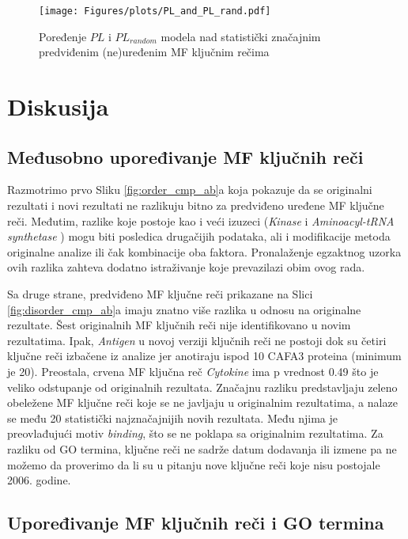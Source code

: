 \begin{figure}[th]
\hspace*{-3.0cm} 
\texttt{[image: Figures/plots/PL\_and\_PL\_rand.pdf]}
\caption {
  Poređenje $PL$ i $PL_{random}$ modela nad statistički značajnim predviđenim (ne)uređenim MF ključnim rečima
}
\label{fig:PLrand}
\end{figure}




\chapter{Diskusija} %

\label{Diskusija} %

\section{Međusobno upoređivanje MF ključnih reči}

Razmotrimo prvo Sliku \ref{fig:order_cmp_ab}a koja pokazuje da se originalni
rezultati i novi rezultati ne razlikuju bitno za predviđeno uređene MF ključne
reči. Međutim, razlike koje postoje kao i veći izuzeci (\textit{Kinase} i
\textit{Aminoacyl-tRNA synthetase} )  mogu biti posledica drugačijih podataka,
ali i modifikacije metoda originalne analize ili čak kombinacije oba faktora.
Pronalaženje egzaktnog uzorka ovih razlika zahteva dodatno istraživanje koje
prevazilazi obim ovog rada.

Sa druge strane, predviđeno  MF ključne reči prikazane na
Slici \ref{fig:disorder_cmp_ab}a imaju znatno više razlika u odnosu na
originalne rezultate.  Šest originalnih MF ključnih reči nije identifikovano u
novim rezultatima. Ipak, \textit{Antigen} u novoj verziji ključnih reči ne
postoji dok su četiri ključne reči izbačene iz analize jer anotiraju ispod 10
CAFA3 proteina (minimum je 20).  Preostala, crvena MF ključna reč
\textit{Cytokine} ima p vrednost 0.49 što je veliko odstupanje od originalnih
rezultata. Značajnu razliku predstavljaju zeleno obeležene MF ključne reči koje
se ne javljaju u originalnim rezultatima, a nalaze se među 20 statistički
najznačajnijih novih rezultata. Među njima je preovlađujući motiv \textit{binding}, 
što se ne poklapa sa originalnim rezultatima. Za razliku od GO termina,
ključne reči ne sadrže datum dodavanja ili izmene pa ne možemo da proverimo da
li su u pitanju nove ključne reči koje nisu postojale 2006. godine.


\section{Upoređivanje MF ključnih reči i GO termina}

